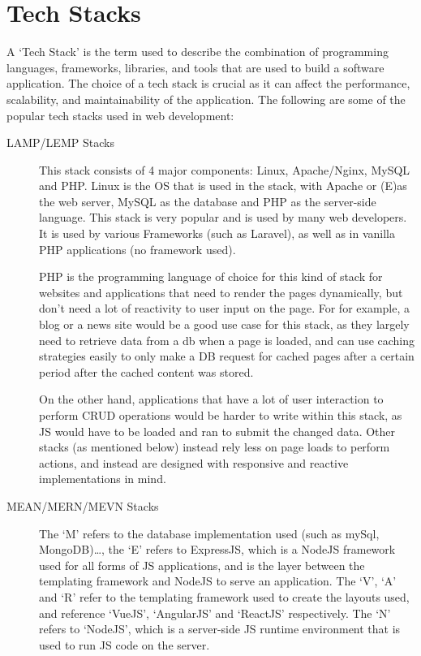 \documentclass[11pt, a4paper,twoside]{report}
\theoremstyle{plain} %
\theoremstyle{definition} %
\numberwithin{equation}{chapter}
\begin{document}
\section{Tech Stacks}\label{sec:techstacks}

A `Tech Stack' is the term used to describe the combination of programming
languages, frameworks, libraries, and tools that are used to build a software
application. The choice of a tech stack is crucial as it can affect the
performance, scalability, and maintainability of the application. The following
are some of the popular tech stacks used in web development:

\begin{description}
    \item[LAMP/LEMP Stacks] {
        This stack consists of 4 major components: Linux, Apache/Nginx, MySQL
        and PHP\@. Linux is the OS that is used in the stack, with Apache or
        (E)\@nginx as the web server, MySQL as the database and PHP as the
        server-side language. This stack is very popular and is used by many
        web developers. It is used by various Frameworks (such as Laravel), as
        well as in vanilla PHP applications (no framework used).

        PHP is the programming language of choice for this kind of stack for
        websites and applications that need to render the pages dynamically,
        but don't need a lot of reactivity to user input on the page. For
        for example, a blog or a news site would be a good use case for this
        stack, as they largely need to retrieve data from a db when a page is
        loaded, and can use caching strategies easily to only make a DB request
        for cached pages after a certain period after the cached content was
        stored.

        On the other hand, applications that have a lot of user interaction to
        perform CRUD operations would be harder to write within this stack, as
        JS would have to be loaded and ran to submit the changed data. Other
        stacks (as mentioned below) instead rely less on page loads to perform
        actions, and instead are designed with responsive and reactive
        implementations in mind.
        }
    \item[MEAN/MERN/MEVN Stacks] {
        The `M' refers to the database implementation used (such as mySql,
        MongoDB)\ldots, the `E' refers to ExpressJS, which is a NodeJS
        framework used for all forms of JS applications, and is the layer
        between the templating framework and NodeJS to serve an application.
        The `V', `A' and `R' refer to the templating framework used to create
        the layouts used, and reference `VueJS', `AngularJS' and `ReactJS'
        respectively. The `N' refers to `NodeJS', which is a server-side JS
        runtime environment that is used to run JS code on the server.

}
\end{description}
\end{document}

